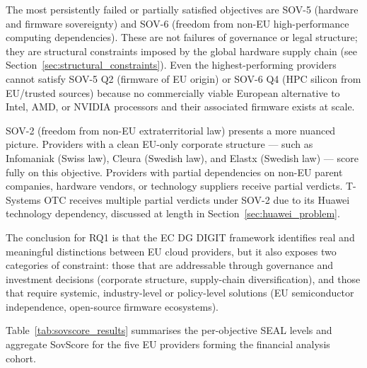 The most persistently failed or partially satisfied objectives are SOV-5 (hardware and firmware sovereignty) and SOV-6 (freedom from non-EU high-performance computing dependencies). These are not failures of governance or legal structure; they are structural constraints imposed by the global hardware supply chain (see Section~\ref{sec:structural_constraints}). Even the highest-performing providers cannot satisfy SOV-5 Q2 (firmware of EU origin) or SOV-6 Q4 (HPC silicon from EU/trusted sources) because no commercially viable European alternative to Intel, AMD, or NVIDIA processors and their associated firmware exists at scale.

SOV-2 (freedom from non-EU extraterritorial law) presents a more nuanced picture. Providers with a clean EU-only corporate structure — such as Infomaniak (Swiss law), Cleura (Swedish law), and Elastx (Swedish law) — score fully on this objective. Providers with partial dependencies on non-EU parent companies, hardware vendors, or technology suppliers receive partial verdicts. T-Systems OTC receives multiple partial verdicts under SOV-2 due to its Huawei technology dependency, discussed at length in Section~\ref{sec:huawei_problem}.

The conclusion for RQ1 is that the EC DG DIGIT framework identifies real and meaningful distinctions between EU cloud providers, but it also exposes two categories of constraint: those that are addressable through governance and investment decisions (corporate structure, supply-chain diversification), and those that require systemic, industry-level or policy-level solutions (EU semiconductor independence, open-source firmware ecosystems).

Table~\ref{tab:sovscore_results} summarises the per-objective SEAL levels and aggregate SovScore for the five EU providers forming the financial analysis cohort.

